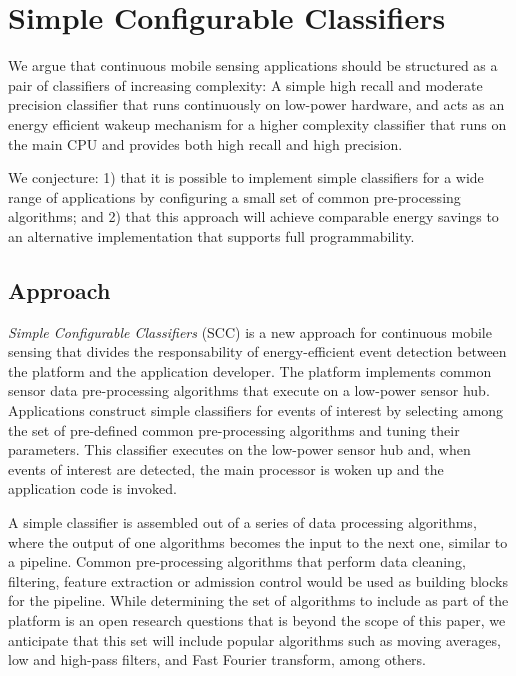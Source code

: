 \section{Simple Configurable Classifiers}
\label{sec:conjecture}

We argue that continuous mobile sensing applications should be
structured as a pair of classifiers of increasing complexity: A simple
high recall and moderate precision classifier that runs continuously
on low-power hardware, and acts as an energy efficient wakeup
mechanism for a higher complexity classifier that runs on the main CPU
and provides both high recall and high precision.

We conjecture: 1) that it is possible to implement simple classifiers for a 
wide range of applications by configuring a small set of common pre-processing 
algorithms; and  2) that this approach will achieve comparable energy 
savings to an alternative implementation that supports full programmability.

\subsection {Approach}

{\em Simple Configurable Classifiers} (SCC) is a new approach for
continuous mobile sensing that divides the responsability of
energy-efficient event detection between the platform and
the application developer.  The platform implements common sensor data
pre-processing algorithms that execute on a low-power sensor hub.
Applications construct simple classifiers for events of interest by
selecting among the set of pre-defined common pre-processing
algorithms and tuning their parameters.  This classifier executes on
the low-power sensor hub and, when events of interest are detected,
the main processor is woken up and the application code is invoked.
  
A simple classifier is assembled out of a series of data processing
algorithms, where the output of one algorithms becomes the input to
the next one, similar to a pipeline.  Common pre-processing algorithms
that perform data cleaning, filtering, feature extraction or admission
control would be used as building blocks for the pipeline.  While
determining the set of algorithms to include as part of the platform
is an open research questions that is beyond the scope of this paper,
we anticipate that this set will include popular algorithms such as
moving averages, low and high-pass filters, and Fast Fourier
transform, among others.


